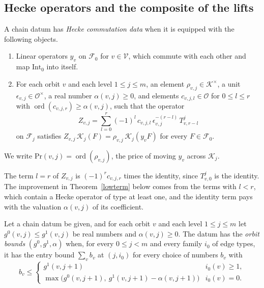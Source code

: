 \subsection{Hecke operators and the composite of the lifts}\label{sec:heckecomp}

\begin{definition}\label{heckecomm}
A chain datum has \emph{Hecke commutation data} when it is equipped with the following objects.
\begin{enumerate}
\item[(D2)] Linear operators $y_v$ on $\mathcal F_0$ for $v\in\mathcal V$, which commute with each other and map $\mathrm{Int}_0$ into itself.
\item[(D3)] For each orbit $v$ and each level $1\le j\le m$, an element $\rho_{v,j}\in\mathcal K^\times$, a unit $\epsilon_{v,j}\in\mathcal O^\times$, a real number $\alpha(v,j)\ge0$, and elements $c_{v,j,l}\in\mathcal O$ for $0\le l\le r$ with $\operatorname{ord}(c_{v,j,r})\ge\alpha(v,j)$, such that the operator
\[
Z_{v,j}=\sum_{l=0}^r(-1)^l\,c_{v,j,l}\,\epsilon_{v,j}^{-(r-l)}\,T^j_{v,r-l}
\]
on $\mathcal F_j$ satisfies $Z_{v,j}\,\mathcal K_j(F)=\rho_{v,j}\,\mathcal K_j(y_vF)$ for every $F\in\mathcal F_0$.
\end{enumerate}
We write $\mathrm{Pr}(v,j)=\operatorname{ord}(\rho_{v,j})$, the price of moving $y_v$ across $\mathcal K_j$.
\end{definition}

The term $l=r$ of $Z_{v,j}$ is $(-1)^rc_{v,j,r}$ times the identity, since $T^j_{v,0}$ is the identity. The improvement in Theorem~\ref{lowterm} below comes from the terms with $l<r$, which contain a Hecke operator of type at least one, and the identity term pays with the valuation $\alpha(v,j)$ of its coefficient.

\begin{definition}\label{orbitbounds}
Let a chain datum be given, and for each orbit $v$ and each level $1\le j\le m$ let $g^0(v,j)\le g^1(v,j)$ be real numbers and $\alpha(v,j)\ge0$. The datum has the \emph{orbit bounds} $(g^0,g^1,\alpha)$ when, for every $0\le j<m$ and every family $i_0$ of edge types, it has the entry bound $\sum_vb_v$ at $(j,i_0)$ for every choice of numbers $b_v$ with
\[
b_v\le\begin{cases}g^1(v,j+1)&i_0(v)\ge1,\\\max\big(g^0(v,j+1),\ g^1(v,j+1)-\alpha(v,j+1)\big)&i_0(v)=0.\end{cases}
\]
\end{definition}

